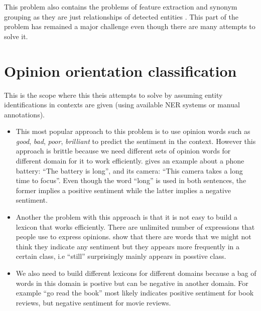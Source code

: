 \documentclass{article}
\begin{document}
    This problem also contains the problems of feature extraction and synonym
grouping as they are just relationships of detected entities
\cite{WebKnox2011}. This part of the problem has remained a major challenge
even though there are many attempts to solve it.


  \section{Opinion orientation classification}
    This is the scope where this theis attempts to solve by assuming 
entity identifications in contexts are given (using available NER systems or
manual annotations). 
    \begin{itemize}
      \item This most popular approach to this problem is to use opinion words
such as \textit{good}, \textit{bad}, \textit{poor}, \textit{brilliant} to
predict the sentiment in the context. However this approach is brittle because
we need different sets of opinion words for different domain for it to work
efficiently. \citet{Liu2010} gives an example about a phone battery: ``The
battery is long'', and its camera: ``This camera takes a long time to focus''.
Even though the word ``long'' is used in both sentences, the former implies a
positive sentiment while the latter implies a negative sentiment.

      \item Another the problem with this approach is that it is not easy to
build a lexicon that works efficiently. There are unlimited number of
expressions that people use to express opinions. \citet{Pang2002} show that
there are words that we might not think they indicate any sentiment but they
appears more frequently in a certain class, i.e ``still'' surprisingly mainly
appears in posstive class.

      \item We also need to build different lexicons for different domains
because a bag of words in this domain is postive but can be negative in another
domain. For example ``go read the book'' most likely indicates positive
sentiment for book reviews, but negative sentiment for movie reviews.

    \end{itemize}
\end{document}
